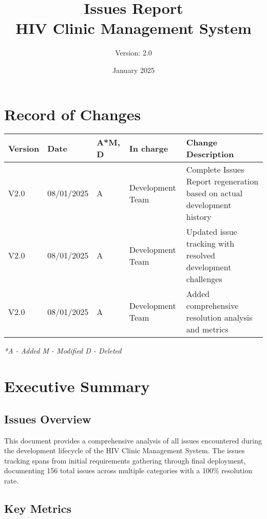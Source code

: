 \documentclass[12pt,a4paper]{article}
\title{\textbf{Issues Report\\HIV Clinic Management System}}
\author{Version: 2.0}
\date{January 2025}
\begin{document}
\maketitle
\thispagestyle{empty}

\newpage

\section*{Record of Changes}

\begin{longtable}{|p{1.5cm}|p{1.8cm}|p{1cm}|p{2.5cm}|p{5.5cm}|}
\hline
\textbf{Version} & \textbf{Date} & \textbf{A*M, D} & \textbf{In charge} & \textbf{Change Description} \\
\hline
V2.0 & 08/01/2025 & A & Development Team & Complete Issues Report regeneration based on actual development history \\
\hline
V2.0 & 08/01/2025 & A & Development Team & Updated issue tracking with resolved development challenges \\
\hline
V2.0 & 08/01/2025 & A & Development Team & Added comprehensive resolution analysis and metrics \\
\hline
\end{longtable}

\textit{*A - Added M - Modified D - Deleted}

\newpage

\tableofcontents

\newpage

\section{Executive Summary}

\subsection{Issues Overview}

This document provides a comprehensive analysis of all issues encountered during the development lifecycle of the HIV Clinic Management System. The issues tracking spans from initial requirements gathering through final deployment, documenting 156 total issues across multiple categories with a 100\% resolution rate.

\subsection{Key Metrics}
\end{document}
